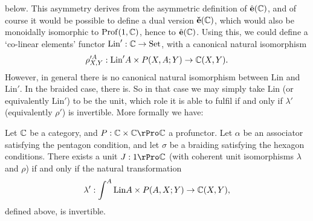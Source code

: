 \documentclass{robinminion}
\newcommand\Prof{\mathrm{Prof}}
\newcommand\Lin{\mathrm{Lin}}
\renewcommand\e{\hat{\mathbf{e}}}
\begin{document}
below. This asymmetry derives from the asymmetric definition of $\e(\C)$,
and of course it would be possible to define a dual version $\mbox{\textbf{\v e}}(\C)$,
which would also be monoidally isomorphic to $\Prof(1,\C)$, hence to $\e(\C)$.
Using this, we could define a `co-linear elements' functor $\Lin': \C\to\Set$,
with a canonical natural isomorphism
\[
	\rho'^A_{X,Y}: \Lin'A\times P(X,A;Y) \to \C(X,Y).
\]
However, in general there is no canonical natural isomorphism between
$\Lin$ and $\Lin'$. In the braided case, there is. So in that case we
may simply take $\Lin$ (or equivalently $\Lin'$) to be the unit, which
role it is able to fulfil if and only if $\lambda'$ (equivalently $\rho'$)
is invertible. More formally we have:
\begin{propn}
	Let $\mathbb{C}$ be a category, and $P: \C\times\C\rPro\C$ a profunctor.
	Let $\alpha$ be an associator satisfying the pentagon
	condition, and let $\sigma$ be a braiding satisfying the
	hexagon conditions. There exists a unit $J:1\rPro\C$ (with
	coherent unit isomorphisms $\lambda$ and $\rho$) if and only
	if the natural transformation
	\[
		\lambda': \int^A \Lin A\times P(A,X;Y) \to \C(X,Y),
	\]
	defined above, is invertible.
\end{propn}
\end{document}
